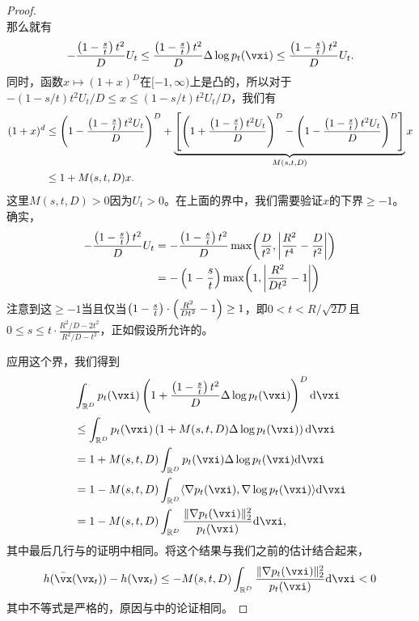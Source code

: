 \documentclass[../../book-main_zh.tex]{subfiles}
\begin{document}
\begin{proof}
\begin{equation}
    \end{equation}
    那么就有
    \begin{equation}
        -\frac{\bp{1 - \frac{s}{t}}t^{2}}{D}U_{t} \leq \frac{\bp{1 - \frac{s}{t}}t^{2}}{D}\Delta \log p_{t}(\vxi) \leq \frac{\bp{1 - \frac{s}{t}}t^{2}}{D}U_{t}.
    \end{equation}
    同时，函数\(x \mapsto (1 + x)^{D}\)在\([-1, \infty)\)上是凸的，所以对于
    \(-(1-s/t)t^{2}U_{t}/D \leq x \leq (1-s/t)t^{2}U_{t}/D\)，我们有
    \begin{align}
        (1 + x)^{d} 
        &\leq \left(1 - \frac{\left(1 - \frac{s}{t}\right)t^{2}U_{t}}{D}\right)^{D} + \underbrace{\left[\left(1 + \frac{\left(1 - \frac{s}{t}\right)t^{2}U_{t}}{D}\right)^{D} - \left(1 - \frac{\left(1 - \frac{s}{t}\right)t^{2}U_{t}}{D}\right)^{D}\right]}_{M(s, t, D)}x \\ 
        &\leq 1 + M(s, t, D)x.
    \end{align}
    这里\(M(s, t, D) > 0\)因为\(U_{t} > 0\)。在上面的界中，我们需要验证\(x\)的下界\(\geq -1\)。确实，
    \begin{align}
        -\frac{\bp{1 - \frac{s}{t}}t^{2}}{D}U_{t}
        &= -\frac{\bp{1 - \frac{s}{t}}t^{2}}{D}\max\rp{\frac{D}{t^{2}}, \abs*{\frac{R^{2}}{t^{4}} - \frac{D}{t^{2}}}} \\ 
        &= -\bp{1 - \frac{s}{t}}\max\rp{1, \abs*{\frac{R^{2}}{Dt^{2}} - 1}}
    \end{align}
    注意到这\(\geq -1\)当且仅当\(\left(1 - \frac{s}{t}\right)\cdot\left(\frac{R^{2}}{Dt^{2}} - 1\right) \geq 1\)，即\(0 < t < R/\sqrt{2D}\)且\(0 \leq s \leq t\cdot\frac{R^{2}/D - 2t^{2}}{R^{2}/D - t^{2}}\)，正如假设所允许的。
    
    应用这个界，我们得到
    \begin{align}
        &\int_{\R^{D}} p_{t}(\vxi)\bp{1 + \frac{\bp{1 - \frac{s}{t}}t^{2}}{D}\Delta \log p_{t}(\vxi)}^{D}\odif{\vxi} \\ 
        &\leq \int_{\R^{D}}p_{t}(\vxi)\bp{1 + M(s, t, D)\Delta \log p_{t}(\vxi)}\odif{\vxi} \\
        &= 1 + M(s, t, D)\int_{\R^{D}}p_{t}(\vxi)\Delta \log p_{t}(\vxi)\odif{\vxi} \\
        &= 1 - M(s, t, D)\int_{\R^{D}}\ip{\nabla p_{t}(\vxi)}{\nabla\log p_{t}(\vxi)}\odif{\vxi} \\
        &= 1 - M(s, t, D)\int_{\R^{D}}\frac{\norm{\nabla p_{t}(\vxi)}_{2}^{2}}{p_{t}(\vxi)}\odif{\vxi},
    \end{align}
    其中最后几行与的证明中相同。将这个结果与我们之前的估计结合起来，
    \begin{equation}
        h(\bar{\vx}(\vx_{t})) - h(\vx_{t}) \leq - M(s, t, D)\int_{\R^{D}}\frac{\norm{\nabla p_{t}(\vxi)}_{2}^{2}}{p_{t}(\vxi)}\odif{\vxi} < 0
    \end{equation}
    其中不等式是严格的，原因与中的论证相同。
\end{proof}
\end{document}
